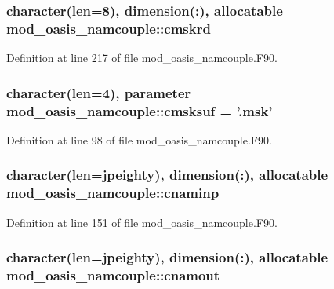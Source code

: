 \hypertarget{classmod__oasis__namcouple_a28c3f9e076a686c8ef916221e8fe4e10}{
\subsubsection[{cmskrd}]{\setlength{\rightskip}{0pt plus 5cm}character(len=8), dimension(\+:), allocatable mod\+\_\+oasis\+\_\+namcouple\+::cmskrd\hspace{0.3cm}{\ttfamily [private]}}}\label{classmod__oasis__namcouple_a28c3f9e076a686c8ef916221e8fe4e10}


Definition at line 217 of file mod\+\_\+oasis\+\_\+namcouple.\+F90.

\hypertarget{classmod__oasis__namcouple_aeea3ba680d5ba05a432c12d64c68c8af}{
\subsubsection[{cmsksuf}]{\setlength{\rightskip}{0pt plus 5cm}character(len=4), parameter mod\+\_\+oasis\+\_\+namcouple\+::cmsksuf = '.msk'\hspace{0.3cm}{\ttfamily [private]}}}\label{classmod__oasis__namcouple_aeea3ba680d5ba05a432c12d64c68c8af}


Definition at line 98 of file mod\+\_\+oasis\+\_\+namcouple.\+F90.

\hypertarget{classmod__oasis__namcouple_a1f6ff08cee0c3c5deb262c1447d88328}{
\subsubsection[{cnaminp}]{\setlength{\rightskip}{0pt plus 5cm}character(len={\bf jpeighty}), dimension(\+:), allocatable mod\+\_\+oasis\+\_\+namcouple\+::cnaminp\hspace{0.3cm}{\ttfamily [private]}}}\label{classmod__oasis__namcouple_a1f6ff08cee0c3c5deb262c1447d88328}


Definition at line 151 of file mod\+\_\+oasis\+\_\+namcouple.\+F90.

\hypertarget{classmod__oasis__namcouple_a71ba84b9a7a813ca2551bcde99a0b5b5}{
\subsubsection[{cnamout}]{\setlength{\rightskip}{0pt plus 5cm}character(len={\bf jpeighty}), dimension(\+:), allocatable mod\+\_\+oasis\+\_\+namcouple\+::cnamout\hspace{0.3cm}{\ttfamily [private]}}}\label{classmod__oasis__namcouple_a71ba84b9a7a813ca2551bcde99a0b5b5}


